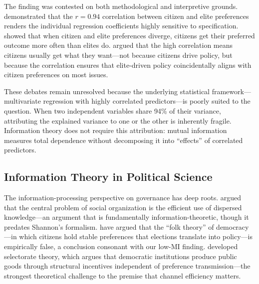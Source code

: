 \documentclass[twocolumn,10pt]{article}
\begin{document}
The finding was contested on both methodological and interpretive grounds.  \citet{bashir2015} demonstrated that the $r = 0.94$ correlation between citizen and elite preferences renders the individual regression coefficients highly sensitive to specification.  \citet{branham2017} showed that when citizen and elite preferences diverge, citizens get their preferred outcome more often than elites do.  \citet{enns2015} argued that the high correlation means citizens usually get what they want---not because citizens drive policy, but because the correlation ensures that elite-driven policy coincidentally aligns with citizen preferences on most issues.

These debates remain unresolved because the underlying statistical framework---multivariate regression with highly correlated predictors---is poorly suited to the question.  When two independent variables share 94\% of their variance, attributing the explained variance to one or the other is inherently fragile.  Information theory does not require this attribution: mutual information measures total dependence without decomposing it into ``effects'' of correlated predictors.

\subsection{Information Theory in Political Science}

The information-processing perspective on governance has deep roots.  \citet{hayek1945} argued that the central problem of social organization is the efficient use of dispersed knowledge---an argument that is fundamentally information-theoretic, though it predates Shannon's formalism.  \citet{achen2016} have argued that the ``folk theory'' of democracy---in which citizens hold stable preferences that elections translate into policy---is empirically false, a conclusion consonant with our low-MI finding.  \citet{bueno2003} developed selectorate theory, which argues that democratic institutions produce public goods through structural incentives independent of preference transmission---the strongest theoretical challenge to the premise that channel efficiency matters.
\end{document}
